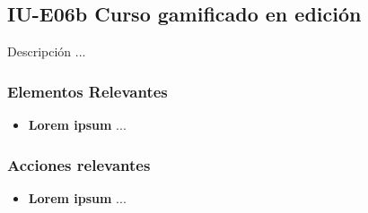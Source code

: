 
\subsection{IU-E06b Curso gamificado en edición}

 Descripción ...


\subsubsection{Elementos Relevantes}

    \begin{itemize}
    \item {\bf Lorem ipsum}
        ...
    \end{itemize}

\subsubsection{Acciones relevantes}

    \begin{itemize}
    \item {\bf Lorem ipsum}
        ...
    \end{itemize}

\clearpage
